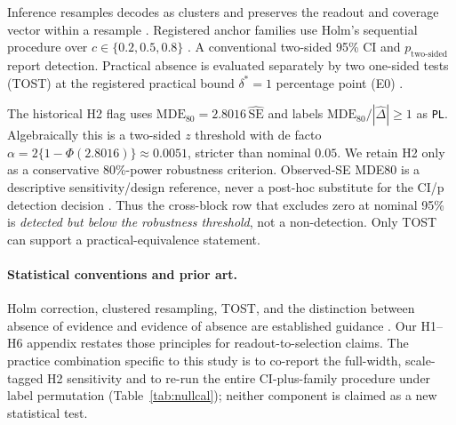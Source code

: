 \documentclass{article}
\begin{document}
Inference resamples decodes as clusters and preserves the readout and coverage vector within a
resample \citep{field2007cluster}.  Registered anchor families use Holm's sequential procedure
over $c\in\{0.2,0.5,0.8\}$ \citep{holm1979simple}.  A conventional two-sided 95\% CI and
$p_{\mathrm{two\mbox{-}sided}}$ report detection.  Practical absence is evaluated separately by
two one-sided tests (TOST) at the registered practical bound $\delta^*=1$ percentage point
(E0) \citep{schuirmann1987comparison}.

The historical H2 flag uses
$\mathrm{MDE}_{80}=2.8016\,\widehat{\mathrm{SE}}$ and labels
$\mathrm{MDE}_{80}/|\hat\Delta|\ge1$ as \texttt{PL}.  Algebraically this is a two-sided
$z$ threshold with de facto
$\alpha=2\{1-\Phi(2.8016)\}\approx0.0051$, stricter than nominal $0.05$.  We retain H2 only as
a conservative 80\%-power robustness criterion.  Observed-SE MDE80 is a descriptive
sensitivity/design reference, never a post-hoc substitute for the CI/p detection decision
\citep{hoenig2001abuse}.  Thus the cross-block row that excludes zero at nominal 95\% is
\emph{detected but below the robustness threshold}, not a non-detection.  Only TOST can support
a practical-equivalence statement.

\paragraph{Statistical conventions and prior art.}
Holm correction, clustered resampling, TOST, and the distinction between absence of evidence and
evidence of absence are established guidance
\citep{holm1979simple,field2007cluster,schuirmann1987comparison,altman1995absence}.
Our H1--H6 appendix restates those principles for readout-to-selection claims.  The practice
combination specific to this study is to co-report the full-width, scale-tagged H2 sensitivity
and to re-run the entire CI-plus-family procedure under label permutation
(Table~\ref{tab:nullcal}); neither component is claimed as a new statistical test.
\end{document}
